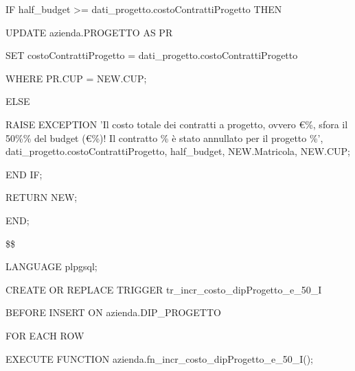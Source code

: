 \begin{flushleft}
\begin{description}
\begin{description}
                    \item IF half\_budget >= dati\_progetto.costoContrattiProgetto THEN
                    \begin{description}    
                        \item UPDATE azienda.PROGETTO AS PR
                        \item SET costoContrattiProgetto = dati\_progetto.costoContrattiProgetto
                        \item WHERE PR.CUP = NEW.CUP;
                    \end{description}
                    \item ELSE
                    \begin{description}
                        \item RAISE EXCEPTION 'Il costo totale dei contratti a progetto, ovvero €\%, sfora il 50\%\% del budget (€\%)! Il contratto \% è stato annullato per il progetto \%', dati\_progetto.costoContrattiProgetto, half\_budget, NEW.Matricola, NEW.CUP;
                    \end{description}
                    \item END IF;
                    \item RETURN NEW;
                \end{description}

                \item END;
                \item \$\$
                \item LANGUAGE plpgsql;
            \end{description}
        \end{flushleft}
    \normalfont

    \ttfamily
        \begin{flushleft}
            \begin{description}
                \item CREATE OR REPLACE TRIGGER tr\_incr\_costo\_dipProgetto\_e\_50\_I
                \item BEFORE INSERT ON azienda.DIP\_PROGETTO
                \item FOR EACH ROW
                \item EXECUTE FUNCTION azienda.fn\_incr\_costo\_dipProgetto\_e\_50\_I();
            \end{description}
        \end{flushleft}
    \normalfont


